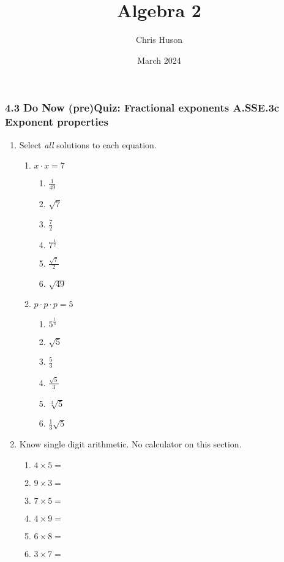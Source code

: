 \documentclass[12pt, twoside]{article}
\title{Algebra 2}
\author{Chris Huson}
\date{March 2024}
\begin{document}
\subsubsection*{4.3 Do Now (pre)Quiz: Fractional exponents \hfill A.SSE.3c Exponent properties}
\begin{enumerate}
\item Select \emph{all} solutions to each equation.
    \begin{multicols}{2}
    \begin{enumerate}
    \item $x \cdot x = 7$
        \begin{enumerate}
            \item $\frac{1}{49}$
            \item $\sqrt{7}$
            \item $\frac{7}{2}$
            \item $7^{\frac{1}{2}}$
            \item $\frac{\sqrt{7}}{2}$
            \item $\sqrt{49}$
        \end{enumerate}
    \item $p \cdot p \cdot p = 5$
        \begin{enumerate}
            \item $5^{\frac{1}{3}}$
            \item $\sqrt{5}$
            \item $\frac{5}{3}$
            \item $\frac{\sqrt{5}}{3}$
            \item $\sqrt[3]{5}$
            \item $\frac{1}{3} \sqrt{5}$
        \end{enumerate}
    \end{enumerate}
    \end{multicols}

\item Know single digit arithmetic. No calculator on this section.
    \begin{multicols}{2}
    \begin{enumerate}[itemsep=0.5cm]
        \item $4 \times 5 =$
        \item $9 \times 3 =$
        \item $7 \times 5 =$
        \item $4 \times 9 =$
        \item $6 \times 8 =$
        \item $3 \times 7 =$
    \end{enumerate}
    \end{multicols}


\end{enumerate}
\end{document}
